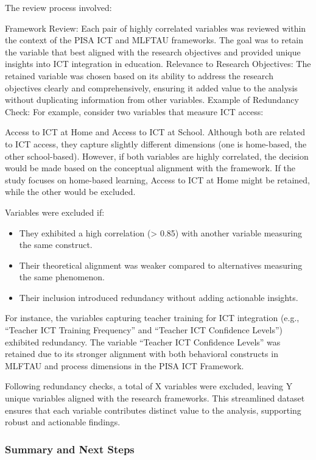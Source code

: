 \documentclass[
]{article}
\begin{document}
The review process involved:

Framework Review: Each pair of highly correlated variables was reviewed
within the context of the PISA ICT and MLFTAU frameworks. The goal was
to retain the variable that best aligned with the research objectives
and provided unique insights into ICT integration in education.
Relevance to Research Objectives: The retained variable was chosen based
on its ability to address the research objectives clearly and
comprehensively, ensuring it added value to the analysis without
duplicating information from other variables. Example of Redundancy
Check: For example, consider two variables that measure ICT access:

Access to ICT at Home and Access to ICT at School. Although both are
related to ICT access, they capture slightly different dimensions (one
is home-based, the other school-based). However, if both variables are
highly correlated, the decision would be made based on the conceptual
alignment with the framework. If the study focuses on home-based
learning, Access to ICT at Home might be retained, while the other would
be excluded.

Variables were excluded if:

\begin{itemize}
\item
  They exhibited a high correlation (\textgreater{} 0.85) with another
  variable measuring the same construct.
\item
  Their theoretical alignment was weaker compared to alternatives
  measuring the same phenomenon.
\item
  Their inclusion introduced redundancy without adding actionable
  insights.
\end{itemize}

For instance, the variables capturing teacher training for ICT
integration (e.g., ``Teacher ICT Training Frequency'' and ``Teacher ICT
Confidence Levels'') exhibited redundancy. The variable ``Teacher ICT
Confidence Levels'' was retained due to its stronger alignment with both
behavioral constructs in MLFTAU and process dimensions in the PISA ICT
Framework.

Following redundancy checks, a total of X variables were excluded,
leaving Y unique variables aligned with the research frameworks. This
streamlined dataset ensures that each variable contributes distinct
value to the analysis, supporting robust and actionable findings.

\hypertarget{summary-and-next-steps-3}{%
\subsubsection{Summary and Next Steps}\label{summary-and-next-steps-3}}
\end{document}
